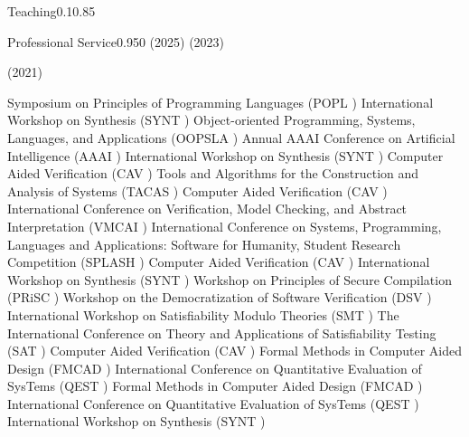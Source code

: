 \documentclass{federico_cv}
\begin{document}
\begin{tblSubSection}{Teaching}{0.1}{0.85}
\end{tblSubSection}



\begin{tblSubSection}{Professional Service}{0.95}{0}
{ (2025)}
{ (2023)}


{ (2021)}

{Symposium on Principles of Programming Languages (POPL )}
{International Workshop on Synthesis (SYNT )}
{Object-oriented Programming, Systems, Languages, and Applications (OOPSLA )}
{Annual AAAI Conference on Artificial Intelligence (AAAI )}
{International Workshop on Synthesis (SYNT )}
{Computer Aided Verification (CAV )}
{Tools and Algorithms for the Construction and Analysis of Systems (TACAS )}
{Computer Aided Verification (CAV )}
{ International Conference on Verification, Model Checking, and Abstract Interpretation (VMCAI )}
{International Conference on Systems, Programming, Languages and Applications: Software for Humanity, Student Research Competition (SPLASH )}
{Computer Aided Verification (CAV )}
{International Workshop on Synthesis (SYNT )}
{Workshop on Principles of Secure Compilation (PRiSC )}
{Workshop on the Democratization of Software Verification (DSV )}
{International Workshop on Satisfiability Modulo Theories (SMT )}
{The International Conference on Theory and Applications of Satisfiability Testing (SAT )}
{Computer Aided Verification (CAV )}
{Formal Methods in Computer Aided Design (FMCAD )}
{International Conference on Quantitative Evaluation of SysTems (QEST )}
{Formal Methods in Computer Aided Design (FMCAD )}
{International Conference on Quantitative Evaluation of SysTems (QEST )}
{International Workshop on Synthesis (SYNT )}



\end{tblSubSection}
\end{document}
